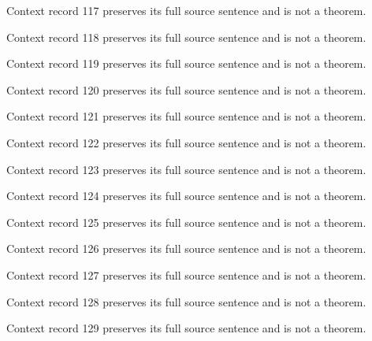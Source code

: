 \documentclass{article}
\begin{document}
\begin{remark}\label{train:context:117}Context record 117 preserves its full source sentence and is not a theorem.\end{remark}
\begin{remark}\label{train:context:118}Context record 118 preserves its full source sentence and is not a theorem.\end{remark}
\begin{remark}\label{train:context:119}Context record 119 preserves its full source sentence and is not a theorem.\end{remark}
\begin{remark}\label{train:context:120}Context record 120 preserves its full source sentence and is not a theorem.\end{remark}
\begin{remark}\label{train:context:121}Context record 121 preserves its full source sentence and is not a theorem.\end{remark}
\begin{remark}\label{train:context:122}Context record 122 preserves its full source sentence and is not a theorem.\end{remark}
\begin{remark}\label{train:context:123}Context record 123 preserves its full source sentence and is not a theorem.\end{remark}
\begin{remark}\label{train:context:124}Context record 124 preserves its full source sentence and is not a theorem.\end{remark}
\begin{remark}\label{train:context:125}Context record 125 preserves its full source sentence and is not a theorem.\end{remark}
\begin{remark}\label{train:context:126}Context record 126 preserves its full source sentence and is not a theorem.\end{remark}
\begin{remark}\label{train:context:127}Context record 127 preserves its full source sentence and is not a theorem.\end{remark}
\begin{remark}\label{train:context:128}Context record 128 preserves its full source sentence and is not a theorem.\end{remark}
\begin{remark}\label{train:context:129}Context record 129 preserves its full source sentence and is not a theorem.\end{remark}
\end{document}
